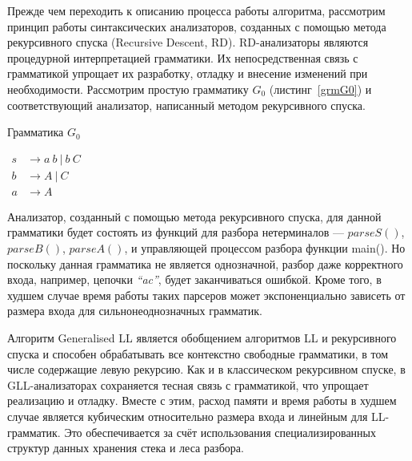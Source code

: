 \documentclass[14pt]{matmex-diploma}
\begin{document}
Прежде чем переходить к описанию процесса работы алгоритма, рассмотрим принцип работы синтаксических анализаторов, созданных с помощью метода рекурсивного спуска (Recursive Descent, RD). RD-анализаторы являются процедурной интерпретацией грамматики. Их непосредственная связь с грамматикой упрощает их разработку, отладку и внесение изменений при необходимости. Рассмотрим простую грамматику $G_0$ (листинг~\ref{grmG0}) и соответствующий анализатор, написанный методом рекурсивного спуска.

\begin{listing}
\caption{Грамматика $G_0$}
\label{grmG0}
\centering
$\begin{array}{rl}
s & \rightarrow a \ b \ | \ b \ C \\
b & \rightarrow A \ | \ C \\
a & \rightarrow A 
\end{array}$
\end{listing}

Анализатор, созданный с помощью метода рекурсивного спуска, для данной грамматики будет состоять из функций для разбора нетерминалов --- $parseS()$, $parseB()$, $parseA()$, и управляющей процессом разбора функции main(). Но поскольку данная грамматика не является однозначной, разбор даже корректного входа, например, цепочки {\it ``ac''}, будет заканчиваться ошибкой. Кроме того, в худшем случае время работы таких парсеров может экспоненциально зависеть от размера входа для сильнонеоднозначных грамматик. 

Алгоритм Generalised LL является обобщением алгоритмов LL и рекурсивного спуска и способен обрабатывать все контекстно свободные грамматики, в том числе содержащие левую рекурсию. Как и в классическом рекурсивном спуске, в GLL-анализаторах сохраняется тесная связь с грамматикой, что упрощает  реализацию и отладку. Вместе с этим, расход памяти и время работы в худшем случае является кубическим относительно размера входа и линейным для LL-грамматик. Это обеспечивается за счёт использования специализированных структур данных хранения стека и леса разбора.
\end{document}
